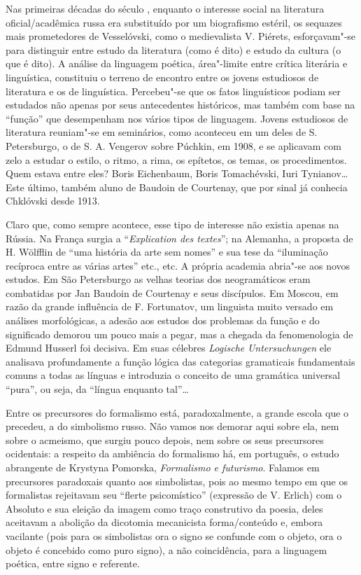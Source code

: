 {Nas primeiras décadas do século , enquanto o interesse social na
literatura oficial/acadêmica russa era substituído por um biografismo
estéril, os sequazes mais prometedores de Vesselóvski, como o
medievalista V. Piérets, esforçavam"-se para distinguir entre estudo da
literatura (como é dito) e estudo da cultura (o que é dito). A análise
da linguagem poética, área"-limite entre crítica literária e linguística,
constituiu o terreno de encontro entre os jovens estudiosos de
literatura e os de linguística. Percebeu"-se que os fatos linguísticos
podiam ser estudados não apenas por seus antecedentes históricos, mas
também com base na ``função'' que desempenham nos vários tipos de
linguagem. Jovens estudiosos de literatura reuniam"-se em seminários,
como aconteceu em um deles de S. Petersburgo, o de S. A. Vengerov sobre
Púchkin, em 1908, e se aplicavam com zelo a estudar o estilo, o ritmo, a
rima, os epítetos, os temas, os procedimentos. Quem estava entre eles?
Boris Eichenbaum, Boris Tomachévski, Iuri Tynianov\ldots{} Este último,
também aluno de Baudoin de Courtenay, que por sinal já conhecia
Chklóvski desde 1913.

Claro que, como sempre acontece, esse tipo de interesse não existia
apenas na Rússia. Na França surgia a ``\emph{Explication des textes}'';
na Alemanha, a proposta de H. Wölfflin de ``uma história da arte sem
nomes'' e sua tese da ``iluminação recíproca entre as várias artes''
etc., etc. A própria academia abria"-se aos novos estudos. Em São
Petersburgo as velhas teorias dos neogramáticos eram combatidas por Jan
Baudoin de Courtenay e seus discípulos. Em Moscou, em razão da grande
influência de F. Fortunatov, um linguista muito versado em análises
morfológicas, a adesão aos estudos dos problemas da função e do
significado demorou um pouco mais a pegar, mas a chegada da
fenomenologia de Edmund Husserl foi decisiva. Em suas célebres
\emph{Logische} \emph{Untersuchungen} ele analisava profundamente a
função lógica das categorias gramaticais fundamentais comuns a todas as
línguas e introduzia o conceito de uma gramática universal ``pura'', ou
seja, da ``língua enquanto tal''\ldots{}

Entre os precursores do formalismo está, paradoxalmente, a grande escola
que o precedeu, a do simbolismo russo. Não vamos nos demorar aqui sobre
ela, nem sobre o acmeismo, que surgiu pouco depois, nem sobre os seus
precursores ocidentais: a respeito da ambiência do formalismo há, em
português, o estudo abrangente de Krystyna Pomorska, \emph{Formalismo e
futurismo}. Falamos em precursores paradoxais quanto aos simbolistas,
pois ao mesmo tempo em que os formalistas rejeitavam seu ``flerte
psicomístico'' (expressão de V. Erlich) com o Absoluto e sua eleição da
imagem como traço construtivo da poesia, deles aceitavam a abolição da
dicotomia mecanicista forma/conteúdo e, embora vacilante (pois para os
simbolistas ora o signo se confunde com o objeto, ora o objeto é
concebido como puro signo), a não coincidência, para a linguagem
poética, entre signo e referente.

}
